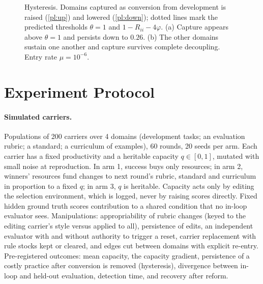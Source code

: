 \documentclass[letterpaper]{article} %
\theoremstyle{definition}
\begin{document}
\begin{table}[t]
\centering
\small
\setlength{\tabcolsep}{3pt}

\caption{Robustness. Top: masking $\beta$ in the coupled field (detection time; delay against the formula; minimum of $V$ after the reform). Middle: feedback $\psi$ into development (reformed inbound conversion of development; minimum of $V$; outcome). Bottom: entry rate $\mu$ (time at which procurement is captured; minimum of $V$; time after the reform at which standards falls below one half). Asterisks: floor breached.}
\label{tab:robust}
\end{table}

\begin{figure}[t]
\centering

\caption{Hysteresis. Domains captured as conversion from development is raised (\ref{pl:up}) and lowered (\ref{pl:down}); dotted lines mark the predicted thresholds $\theta=1$ and $1-R_{ii}-4\varphi$. (a) Capture appears above $\theta=1$ and persists down to $0.26$. (b) The other domains sustain one another and capture survives complete decoupling. Entry rate $\mu=10^{-6}$.}
\label{fig:hyst}
\end{figure}

\section{Experiment Protocol}\label{app:protocol}

\paragraph{Simulated carriers.} Populations of 200 carriers over 4 domains (development tasks; an evaluation rubric; a standard; a curriculum of examples), 60 rounds, 20 seeds per arm. Each carrier has a fixed productivity and a heritable capacity $q\in[0,1]$, mutated with small noise at reproduction. In arm 1, success buys only resources; in arm 2, winners' resources fund changes to next round's rubric, standard and curriculum in proportion to a fixed $q$; in arm 3, $q$ is heritable. Capacity acts only by editing the selection environment, which is logged, never by raising scores directly. Fixed hidden ground truth scores contribution to a shared condition that no in-loop evaluator sees. Manipulations: appropriability of rubric changes (keyed to the editing carrier's style versus applied to all), persistence of edits, an independent evaluator with and without authority to trigger a reset, carrier replacement with rule stocks kept or cleared, and edges cut between domains with explicit re-entry. Pre-registered outcomes: mean capacity, the capacity gradient, persistence of a costly practice after conversion is removed (hysteresis), divergence between in-loop and held-out evaluation, detection time, and recovery after reform.
\end{document}
